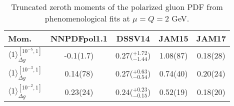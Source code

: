 \begin{table}[!b]
\centering
\footnotesize
\begin{tabular}{lcccc}
\toprule
Mom. & NNPDFpol1.1 & DSSV14 & JAM15 & JAM17\\
\midrule
$\langle 1\rangle_{\Delta g}^{[10^{-5},1]}$  
& -0.1(1.7) & 0.27($^{+1.72}_{-1.44}$)  & 1.08(87) & 0.18(28)\\
$\langle 1\rangle_{\Delta g}^{[10^{-3},1]}$  
& 0.14(78)  & 0.27($^{+0.63}_{-0.54}$)  & 0.74(40) & 0.20(24)\\
$\langle 1\rangle_{\Delta g}^{[10^{-2},1]}$  
& 0.23(24)  & 0.24($^{+0.23}_{-0.15}$)  & 0.52(19) & 0.18(20)\\
\bottomrule
\end{tabular}
\caption{\small Truncated zeroth moments of the polarized gluon PDF from 
phenomenological fits at $\mu=Q=2$ GeV.}
\label{tab:polgmom}
\end{table}
